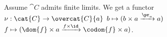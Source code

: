 \begin{definition}
Assume $\cat{C}$ admits finite limits.
We get a functor
$\nu:\cat{C} \rightarrow \overcat{C}{a}$
$b\mapsto (b\times a \xrightarrow{\pr_a} a)$
$f \mapsto (\dom{f}\times a \xrightarrow{f \times \id} \codom{f}\times a)$.
\end{definition}